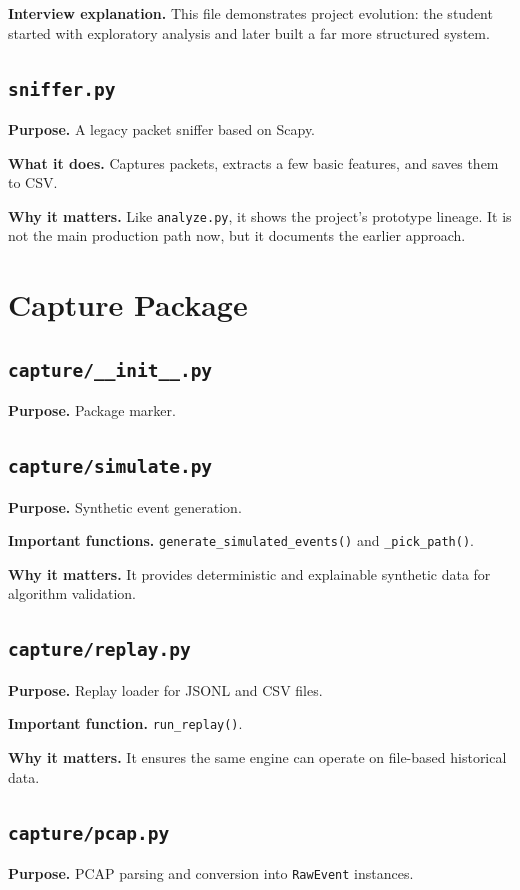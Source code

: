 \documentclass[12pt,a4paper]{report}
\begin{document}
\textbf{Interview explanation.} This file demonstrates project evolution: the student started with exploratory analysis and later built a far more structured system.

\section{\texttt{sniffer.py}}
\textbf{Purpose.} A legacy packet sniffer based on Scapy.

\textbf{What it does.} Captures packets, extracts a few basic features, and saves them to CSV.

\textbf{Why it matters.} Like \texttt{analyze.py}, it shows the project’s prototype lineage. It is not the main production path now, but it documents the earlier approach.

\chapter{Capture Package}
\section{\texttt{capture/\_\_init\_\_.py}}
\textbf{Purpose.} Package marker.

\section{\texttt{capture/simulate.py}}
\textbf{Purpose.} Synthetic event generation.

\textbf{Important functions.} \texttt{generate\_simulated\_events()} and \texttt{\_pick\_path()}.

\textbf{Why it matters.} It provides deterministic and explainable synthetic data for algorithm validation.

\section{\texttt{capture/replay.py}}
\textbf{Purpose.} Replay loader for JSONL and CSV files.

\textbf{Important function.} \texttt{run\_replay()}.

\textbf{Why it matters.} It ensures the same engine can operate on file-based historical data.

\section{\texttt{capture/pcap.py}}
\textbf{Purpose.} PCAP parsing and conversion into \texttt{RawEvent} instances.
\end{document}
